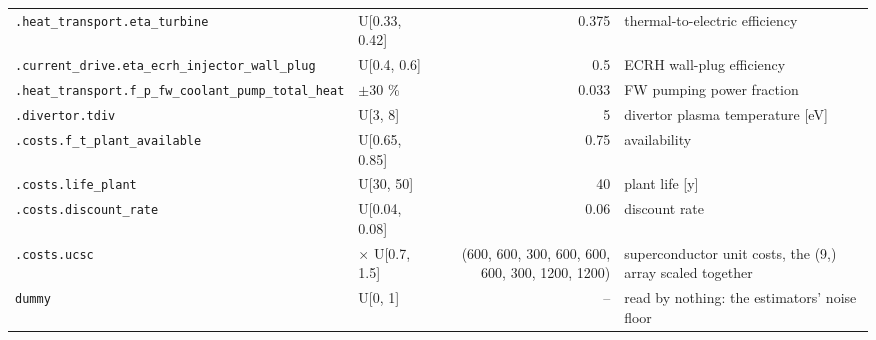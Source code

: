 \begin{tabular}{llrl}
\texttt{.heat\_transport.eta\_turbine} & U[0.33, 0.42] & 0.375 & thermal-to-electric efficiency \\
\texttt{.current\_drive.eta\_ecrh\_injector\_wall\_plug} & U[0.4, 0.6] & 0.5 & ECRH wall-plug efficiency \\
\texttt{.heat\_transport.f\_p\_fw\_coolant\_pump\_total\_heat} & $\pm$30 \% & 0.033 & FW pumping power fraction \\
\texttt{.divertor.tdiv} & U[3, 8] & 5 & divertor plasma temperature [eV] \\
\texttt{.costs.f\_t\_plant\_available} & U[0.65, 0.85] & 0.75 & availability \\
\texttt{.costs.life\_plant} & U[30, 50] & 40 & plant life [y] \\
\texttt{.costs.discount\_rate} & U[0.04, 0.08] & 0.06 & discount rate \\
\texttt{.costs.ucsc} & $\times$ U[0.7, 1.5] & (600, 600, 300, 600, 600, 600, 300, 1200, 1200) & superconductor unit costs, the (9,) array scaled together \\
\texttt{dummy} & U[0, 1] & -- & read by nothing: the estimators' noise floor \\
\bottomrule
\end{tabular}
